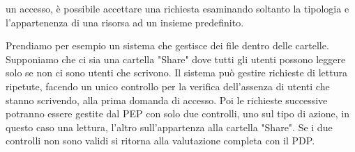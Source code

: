 un accesso, è possibile accettare una richiesta esaminando soltanto la tipologia e l'appartenenza di una risorsa ad
un insieme predefinito.\\\par
Prendiamo per esempio un sistema che gestisce dei file dentro delle cartelle. Supponiamo che ci sia una cartella
"Share" dove tutti gli utenti possono leggere solo se non ci sono utenti che scrivono.
Il sistema può gestire richieste di lettura ripetute, facendo un unico controllo per la verifica dell'assenza di
utenti che stanno scrivendo, alla prima domanda di accesso. Poi le richieste successive potranno essere
gestite dal PEP con solo due controlli, uno sul tipo di azione, in questo caso una lettura, l'altro sull'appartenza
alla cartella "Share". Se i due controlli non sono validi si ritorna alla valutazione completa con il PDP.
